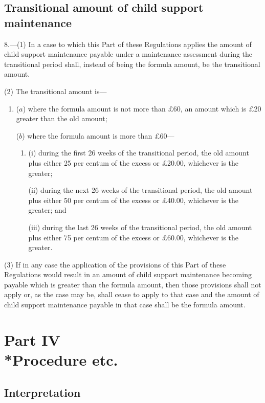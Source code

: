 \documentclass[a4paper]{article}
\newcommand{\parthead}{}
\begin{document}
\subsection[8. Transitional amount of child support maintenance]{Transitional amount of child support maintenance}

8.—(1) In a case to which this Part of these Regulations applies the amount of child support maintenance payable under a maintenance assessment during the transitional period shall, instead of being the formula amount, be the transitional amount.

(2) The transitional amount is—
\begin{enumerate}\item[]
($a$) where the formula amount is not more than £60, an amount which is £20 greater than the old amount;

($b$) where the formula amount is more than £60—
\begin{enumerate}\item[]
(i) during the first 26 weeks of the transitional period, the old amount plus either 25 per centum of the excess or £20.00, whichever is the greater;

(ii) during the next 26 weeks of the transitional period, the old amount plus either 50 per centum of the excess or £40.00, whichever is the greater; and

(iii) during the last 26 weeks of the transitional period, the old amount plus either 75 per centum of the excess or £60.00, whichever is the greater.
\end{enumerate}
\end{enumerate}

(3) If in any case the application of the provisions of this Part of these Regulations would result in an amount of child support maintenance becoming payable which is greater than the formula amount, then those provisions shall not apply or, as the case may be, shall cease to apply to that case and the amount of child support maintenance payable in that case shall be the formula amount.

\section[Part IV --- Procedure etc.]{Part IV\\*Procedure etc.}

\renewcommand\parthead{--- Part IV}

\subsection[9. Interpretation]{Interpretation}
\end{document}

